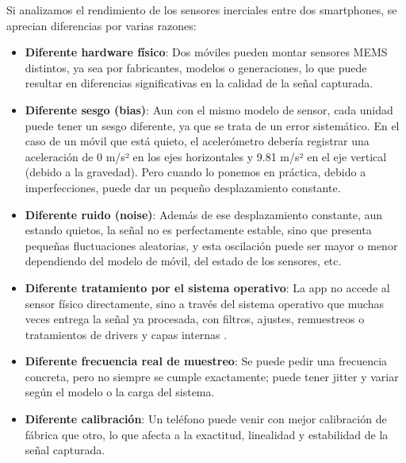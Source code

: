 Si analizamos el rendimiento de los sensores inerciales entre dos smartphones, se aprecian diferencias por varias razones:
\begin{itemize}
  \item \textbf{Diferente hardware físico}: Dos móviles pueden montar sensores MEMS distintos, ya sea por fabricantes, modelos o generaciones, lo que puede resultar en diferencias significativas en la calidad de la señal capturada.
  \item \textbf{Diferente sesgo (bias)}: Aun con el mismo modelo de sensor, cada unidad puede tener un sesgo diferente, ya que se trata de un error sistemático. En el caso de un móvil que está quieto, el acelerómetro debería registrar una aceleración de 0 m/s² en los ejes horizontales y 9.81 m/s² en el eje vertical (debido a la gravedad). Pero cuando lo ponemos en práctica, debido a imperfecciones, puede dar un pequeño desplazamiento constante.
  \item \textbf{Diferente ruido (noise)}: Además de ese desplazamiento constante, aun estando quietos, la señal no es perfectamente estable, sino que presenta pequeñas fluctuaciones aleatorias, y esta oscilación puede ser mayor o menor dependiendo del modelo de móvil, del estado de los sensores, etc.
  \item \textbf{Diferente tratamiento por el sistema operativo}: La app no accede al sensor físico directamente, sino a través del sistema operativo que muchas veces entrega la señal ya procesada, con filtros, ajustes, remuestreos o tratamientos de drivers y capas internas .
  \item \textbf{Diferente frecuencia real de muestreo}: Se puede pedir una frecuencia concreta, pero no siempre se cumple exactamente; puede tener jitter y variar según el modelo o la carga del sistema.
  \item \textbf{Diferente calibración}: Un teléfono puede venir con mejor calibración de fábrica que otro, lo que afecta a la exactitud, linealidad y estabilidad de la señal capturada.
\end{itemize}



